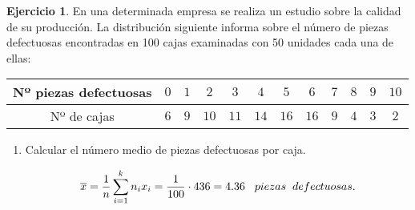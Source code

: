 \documentclass[a4paper, 12pt]{article}
\theoremstyle{definition}
\newtheorem{ej}{Ejercicio}
\begin{document}
\begin{ej}
En una determinada empresa se realiza un estudio sobre la calidad de su producción. La distribución siguiente informa sobre el número de piezas defectuosas encontradas en 100 cajas examinadas con 50 unidades cada una de ellas:

\begin{center}
    \begin{tabular}{|c|c|c|c|c|c|c|c|c|c|c|c|}
    \hline
     Nº piezas defectuosas & \(0\) & \(1\) & \(2\) & \(3\) & \(4\) & \(5\) & \(6\) & \(7\) & \(8\) & \(9\) & \(10\) \\
     \hline
     Nº de cajas & \(6\) & \(9\) & \(10\) & \(11\) & \(14\) & \(16\) & \(16\) & \(9\) & \(4\) & \(3\) & \(2\) \\
     \hline
    \end{tabular}
    
\end{center}

\begin{center}
\end{center}

\begin{enumerate}[label=\textit{\alph*)}]
    \item Calcular el número medio de piezas defectuosas por caja.
    
    \[
    \overline{x} = \frac{1}{n} \sum_{i=1}^{k}n_ix_i = \frac{1}{100} \cdot 436 = 4.36 \hspace{0.3cm} piezas \hspace{0.2cm} defectuosas.
    \]
    

\end{enumerate}
\end{ej}
\end{document}
